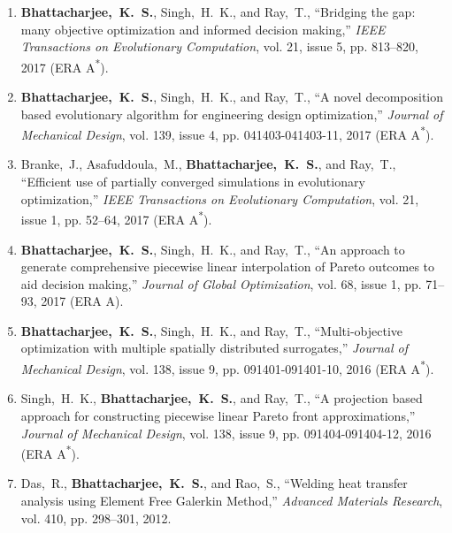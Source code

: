 \documentclass[10pt]{article}
\begin{document}
\begin{enumerate}[itemsep = 0em]
\setcounter{enumi}{0}

\item 
\textbf{Bhattacharjee,~K.~S.}, {Singh,~H.~K.}, and {Ray,~T.}, ``Bridging the gap: many objective optimization and informed decision making,'' {\em IEEE Transactions on Evolutionary Computation}, vol. 21, issue 5, pp. 813--820, 2017 (ERA A\textsuperscript{*}).

\item 
\textbf{Bhattacharjee,~K.~S.}, {Singh,~H.~K.}, and {Ray,~T.}, ``A novel decomposition based evolutionary algorithm for engineering design optimization,'' {\em Journal of Mechanical Design}, vol. 139, issue 4, pp. 041403-041403-11, 2017 (ERA A\textsuperscript{*}).

\item
{Branke,~J.}, {Asafuddoula,~M.}, \textbf{Bhattacharjee,~K.~S.}, and {Ray,~T.}, ``Efficient use of partially converged simulations in evolutionary optimization,'' {\em IEEE Transactions on Evolutionary Computation}, vol. 21, issue 1, pp. 52--64, 2017 (ERA A\textsuperscript{*}).

\item
\textbf{Bhattacharjee,~K.~S.}, {Singh,~H.~K.}, and {Ray,~T.}, ``An approach to generate comprehensive piecewise linear interpolation of Pareto outcomes to aid decision making,'' {\em Journal of Global Optimization}, vol. 68, issue 1, pp. 71--93, 2017 (ERA A).

\item
\textbf{Bhattacharjee,~K.~S.}, {Singh,~H.~K.}, and {Ray,~T.}, ``Multi-objective optimization with multiple spatially distributed surrogates,'' {\em Journal of Mechanical Design}, vol. 138, issue 9, pp. 091401-091401-10, 2016 (ERA A\textsuperscript{*}).

\item
{Singh,~H.~K.}, \textbf{Bhattacharjee,~K.~S.}, and {Ray,~T.}, ``A projection based approach for constructing piecewise linear Pareto front approximations,'' {\em Journal of Mechanical Design}, vol. 138, issue 9, pp. 091404-091404-12, 2016 (ERA A\textsuperscript{*}).

\item
{Das,~R.}, \textbf{Bhattacharjee,~K.~S.}, and {Rao,~S.}, ``Welding heat transfer analysis using Element Free Galerkin Method,'' {\em Advanced Materials Research}, vol. 410, pp. 298--301, 2012. 

\end{enumerate}
\end{document}
